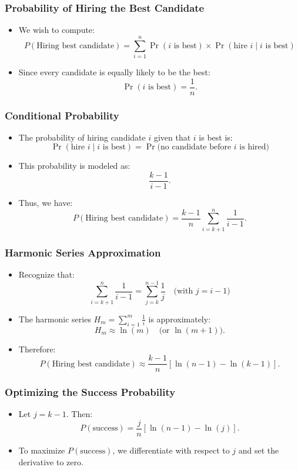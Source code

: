 \begin{frame}
    \frametitle{Probability of Hiring the Best Candidate}
    \begin{itemize}
        \item We wish to compute:
        \[
        P(\text{Hiring best candidate}) = \sum_{i=1}^{n} \Pr(i\text{ is best}) \times \Pr(\text{hire } i \mid i\text{ is best})
        \]
        \item Since every candidate is equally likely to be the best:
        \[
        \Pr(i\text{ is best}) = \frac{1}{n}.
        \]
    \end{itemize}
\end{frame}

\begin{frame}
    \frametitle{Conditional Probability}
    \begin{itemize}
        \item The probability of hiring candidate \(i\) given that \(i\) is best is:
        \[
        \Pr(\text{hire } i \mid i\text{ is best}) = \Pr\Big(\text{no candidate before } i \text{ is hired}\Big)
        \]
        \item This probability is modeled as:
        \[
        \frac{k-1}{i-1}.
        \]
        \item Thus, we have:
        \[
        P(\text{Hiring best candidate}) = \frac{k-1}{n} \sum_{i=k+1}^{n} \frac{1}{i-1}.
        \]
    \end{itemize}
\end{frame}

\begin{frame}
    \frametitle{Harmonic Series Approximation}
    \begin{itemize}
        \item Recognize that:
        \[
        \sum_{i=k+1}^{n} \frac{1}{i-1} = \sum_{j=k}^{n-1} \frac{1}{j} \quad \text{(with } j=i-1\text{)}
        \]
        \item The harmonic series \(H_m = \sum_{i=1}^{m} \frac{1}{i}\) is approximately:
        \[
        H_m \approx \ln(m) \quad \text{(or } \ln(m+1)\text{)}.
        \]
        \item Therefore:
        \[
        P(\text{Hiring best candidate}) \approx \frac{k-1}{n}\left[\ln(n-1)-\ln(k-1)\right].
        \]
    \end{itemize}
\end{frame}

\begin{frame}
    \frametitle{Optimizing the Success Probability}
    \begin{itemize}
        \item Let \(j = k-1\). Then:
        \[
        P(\text{success}) = \frac{j}{n}\left[\ln(n-1)-\ln(j)\right].
        \]
        \item To maximize \(P(\text{success})\), we differentiate with respect to \(j\) and set the derivative to zero.
    \end{itemize}
\end{frame}

